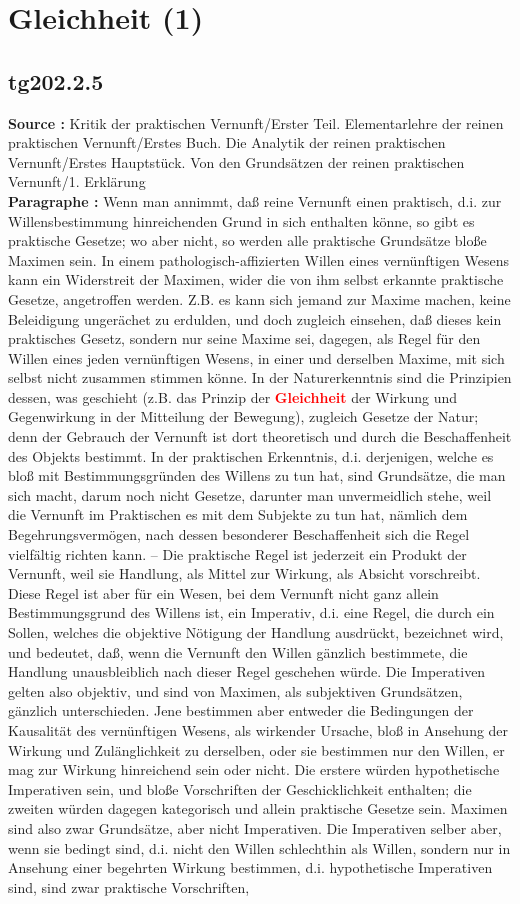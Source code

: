 \documentclass[a4paper,12pt,twoside]{book}
\newcommand{\match}[1]{\textcolor{red}{\textbf{#1}}}
\newcommand{\unnumberedsection}[1]{
	\section*{#1}
	\addcontentsline{toc}{section}{#1}
	\markright{#1}
}
\begin{document}
	\unnumberedsection{Gleichheit (1)} 
	\subsection*{tg202.2.5} 
	\textbf{Source : }Kritik der praktischen Vernunft/Erster Teil. Elementarlehre der reinen praktischen Vernunft/Erstes Buch. Die Analytik der reinen praktischen Vernunft/Erstes Hauptstück. Von den Grundsätzen der reinen praktischen Vernunft/1. Erklärung\\  
	
	\textbf{Paragraphe : }Wenn man annimmt, daß reine Vernunft einen praktisch, d.i. zur Willensbestimmung hinreichenden Grund in sich enthalten könne, so gibt es praktische Gesetze; wo aber nicht, so werden alle praktische Grundsätze bloße Maximen sein. In einem pathologisch-affizierten Willen eines vernünftigen Wesens kann ein Widerstreit der Maximen, wider die von ihm selbst erkannte praktische Gesetze, angetroffen werden. Z.B. es kann sich jemand zur Maxime machen, keine Beleidigung ungerächet zu erdulden, und doch zugleich einsehen, daß dieses kein praktisches Gesetz, sondern nur seine Maxime sei, dagegen, als Regel für den Willen eines jeden vernünftigen Wesens, in einer und derselben Maxime, mit sich selbst nicht zusammen stimmen könne. In der Naturerkenntnis sind die Prinzipien dessen, was geschieht (z.B. das Prinzip der \match{Gleichheit} der Wirkung und Gegenwirkung in der Mitteilung der Bewegung), zugleich Gesetze der Natur; denn der Gebrauch der Vernunft ist dort theoretisch und durch die Beschaffenheit des Objekts bestimmt. In der praktischen Erkenntnis, d.i. derjenigen, welche es bloß mit Bestimmungsgründen des Willens zu tun  hat, sind Grundsätze, die man sich macht, darum noch nicht Gesetze, darunter man unvermeidlich stehe, weil die Vernunft im Praktischen es mit dem Subjekte zu tun hat, nämlich dem Begehrungsvermögen, nach dessen besonderer Beschaffenheit sich die Regel vielfältig richten kann. – Die praktische Regel ist jederzeit ein Produkt der Vernunft, weil sie Handlung, als Mittel zur Wirkung, als Absicht vorschreibt. Diese Regel ist aber für ein Wesen, bei dem Vernunft nicht ganz allein Bestimmungsgrund des Willens ist, ein Imperativ, d.i. eine Regel, die durch ein Sollen, welches die objektive Nötigung der Handlung ausdrückt, bezeichnet wird, und bedeutet, daß, wenn die Vernunft den Willen gänzlich bestimmete, die Handlung unausbleiblich nach dieser Regel geschehen würde. Die Imperativen gelten also objektiv, und sind von Maximen, als subjektiven Grundsätzen, gänzlich unterschieden. Jene bestimmen aber entweder die Bedingungen der Kausalität des vernünftigen Wesens, als wirkender Ursache, bloß in Ansehung der Wirkung und Zulänglichkeit zu derselben, oder sie bestimmen nur den Willen, er mag zur Wirkung hinreichend sein oder nicht. Die erstere würden hypothetische Imperativen sein, und bloße Vorschriften der Geschicklichkeit enthalten; die zweiten würden dagegen kategorisch und allein praktische Gesetze sein. Maximen sind also zwar Grundsätze, aber nicht Imperativen. Die Imperativen selber aber, wenn sie bedingt sind, d.i. nicht den Willen schlechthin als Willen, sondern nur in Ansehung einer begehrten Wirkung bestimmen, d.i. hypothetische Imperativen sind, sind zwar praktische Vorschriften, 
\end{document}
